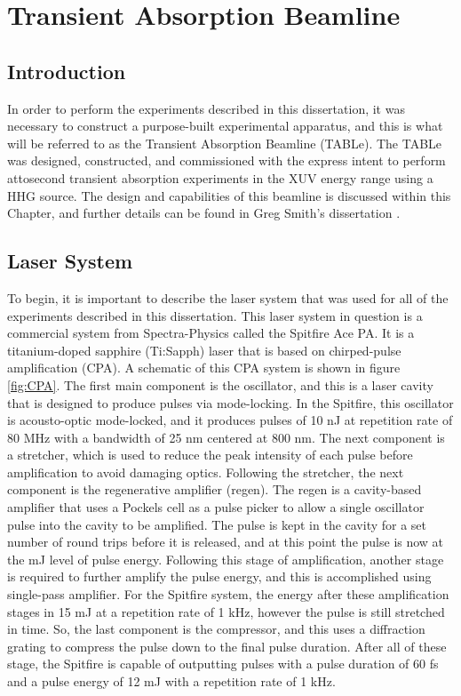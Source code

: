 \chapter{Transient Absorption Beamline}
\label{chap:beamline}

\section{Introduction}
\label{intro_beamline}
In order to perform the experiments described in this dissertation, it was necessary to construct a purpose-built experimental apparatus, and this is what will be referred to as the Transient Absorption Beamline (TABLe).  The TABLe was designed, constructed, and commissioned with the express intent to perform attosecond transient absorption experiments in the XUV energy range using a HHG source.  The design and capabilities of this beamline is discussed within this Chapter, and further details can be found in Greg Smith's dissertation \cite{smithApplicationAttosecondTechniques2020}.

\section{Laser System}
\label{sec:laser_system}
To begin, it is important to describe the laser system that was used for all of the experiments described in this dissertation.  This laser system in question is a commercial system from Spectra-Physics called the Spitfire Ace PA.  It is a titanium-doped sapphire (Ti:Sapph) laser that is based on chirped-pulse amplification (CPA).  A schematic of this CPA system is shown in figure \ref{fig:CPA}.  The first main component is the oscillator, and this is a laser cavity that is designed to produce pulses via mode-locking.  In the Spitfire, this oscillator is acousto-optic mode-locked, and it produces pulses of 10 nJ at repetition rate of 80 MHz with a bandwidth of 25 nm centered at 800 nm.  The next component is a stretcher, which is used to reduce the peak intensity of each pulse before amplification to avoid damaging optics.  Following the stretcher, the next component is the regenerative amplifier (regen).  The regen is a cavity-based amplifier that uses a Pockels cell as a pulse picker to allow a single oscillator pulse into the cavity to be amplified.  The pulse is kept in the cavity for a set number of round trips before it is released, and at this point the pulse is now at the mJ level of pulse energy.  Following this stage of amplification, another stage is required to further amplify the pulse energy, and this is accomplished using single-pass amplifier.  For the Spitfire system, the energy after these amplification stages in 15 mJ at a repetition rate of 1 kHz, however the pulse is still stretched in time.  So, the last component is the compressor, and this uses a diffraction grating to compress the pulse down to the final pulse duration.  After all of these stage, the Spitfire is capable of outputting pulses with a pulse duration of 60 fs and a pulse energy of 12 mJ with a repetition rate of 1 kHz.

